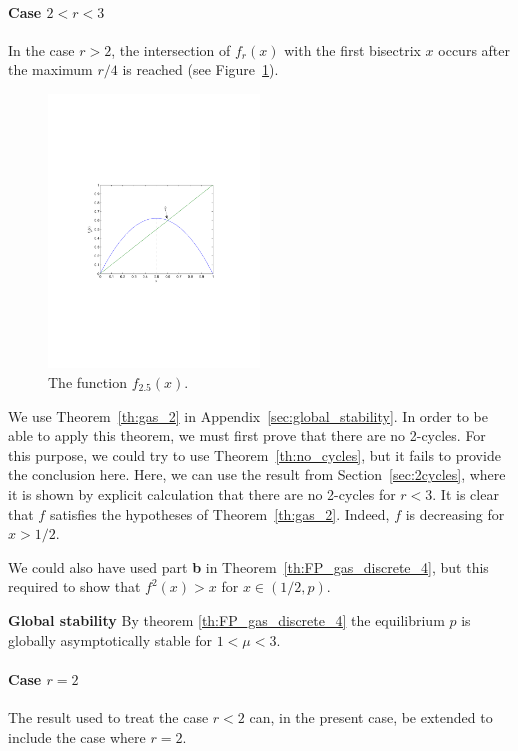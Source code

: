 \paragraph{Case $2<r<3$}
In the case $r>2$, the intersection of $f_r(x)$ with the first bisectrix $x$ occurs after the maximum $r/4$ is reached (see Figure~\ref{fig:logistic_2dot5}).
\begin{figure}[htbp]
\begin{center}
\includegraphics[width=0.5\textwidth]{../figs_02_population_growth/logistic_2dot5}
\end{center}
\caption{The function $f_{2.5}(x)$.}\label{fig:logistic_2dot5}
\end{figure}
We use Theorem~\ref{th:gas_2} in Appendix~\ref{sec:global_stability}. In order to be able to apply this theorem, we must first prove that there are no 2-cycles. For this purpose, we could try to use Theorem~\ref{th:no_cycles}, but it fails to provide the conclusion here. Here, we can use the result from Section~\ref{sec:2cycles}, where it is shown by explicit calculation that there are no 2-cycles for $r<3$.
It is clear that $f$ satisfies the hypotheses of Theorem~\ref{th:gas_2}. Indeed, $f$ is decreasing for $x>1/2$.

\begin{remark}
We could also have used part {\bf b} in Theorem~\ref{th:FP_gas_discrete_4}, but this required to show that $f^2(x)>x$ for $x\in(1/2,p)$.
\end{remark}

{\bf Global stability}
By theorem \ref{th:FP_gas_discrete_4} the equilibrium $p$ is globally asymptotically stable for $1<\mu<3$.


\paragraph{Case $r=2$}
The result used to treat the case $r<2$ can, in the present case, be extended to include the case where $r=2$.


